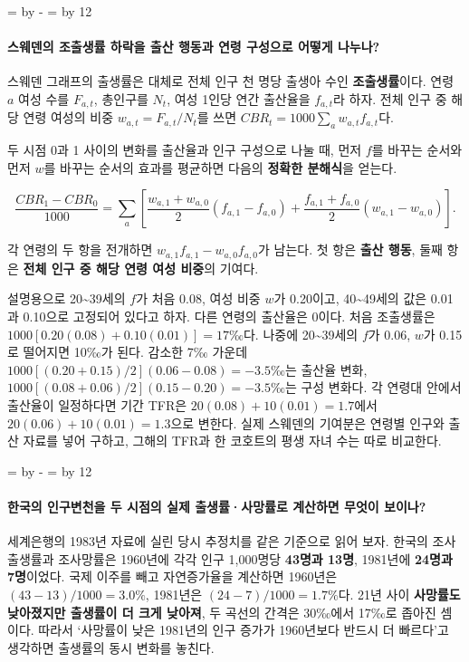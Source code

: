 \documentclass[10pt,a4paper]{article}
\newcommand{\ReserveQuestionSpace}{%
  \par\begingroup
  \dimen0=\pagegoal \advance\dimen0 by -\pagetotal
  \dimen2=\baselineskip \multiply\dimen2 by 12
  \ifdim\dimen0<\dimen2 \newpage\fi
  \endgroup}
\begin{document}
\ReserveQuestionSpace
\paragraph{스웨덴의 조출생률 하락을 출산 행동과 연령 구성으로 어떻게 나누나?}
스웨덴 그래프의 출생률은 대체로 전체 인구 천 명당 출생아 수인 \textbf{조출생률}이다. 연령 $a$ 여성 수를 $F_{a,t}$, 총인구를 $N_t$, 여성 1인당 연간 출산율을 $f_{a,t}$라 하자. 전체 인구 중 해당 연령 여성의 비중 $w_{a,t}=F_{a,t}/N_t$를 쓰면 $CBR_t=1000\sum_a w_{a,t}f_{a,t}$다.\par

두 시점 0과 1 사이의 변화를 출산율과 인구 구성으로 나눌 때, 먼저 $f$를 바꾸는 순서와 먼저 $w$를 바꾸는 순서의 효과를 평균하면 다음의 \textbf{정확한 분해식}을 얻는다.\par

\[
\frac{CBR_1-CBR_0}{1000}
=\sum_a\left[\frac{w_{a,1}+w_{a,0}}{2}(f_{a,1}-f_{a,0})
+\frac{f_{a,1}+f_{a,0}}{2}(w_{a,1}-w_{a,0})\right].
\]

각 연령의 두 항을 전개하면 $w_{a,1}f_{a,1}-w_{a,0}f_{a,0}$가 남는다. 첫 항은 \textbf{출산 행동}, 둘째 항은 \textbf{전체 인구 중 해당 연령 여성 비중}의 기여다.\par

설명용으로 20\textasciitilde{}39세의 $f$가 처음 0.08, 여성 비중 $w$가 0.20이고, 40\textasciitilde{}49세의 값은 0.01과 0.10으로 고정되어 있다고 하자. 다른 연령의 출산율은 0이다. 처음 조출생률은 $1000[0.20(0.08)+0.10(0.01)]=17$‰다. 나중에 20\textasciitilde{}39세의 $f$가 0.06, $w$가 0.15로 떨어지면 10‰가 된다. 감소한 7‰ 가운데 $1000[(0.20+0.15)/2](0.06-0.08)=-3.5$‰는 출산율 변화, $1000[(0.08+0.06)/2](0.15-0.20)=-3.5$‰는 구성 변화다. 각 연령대 안에서 출산율이 일정하다면 기간 TFR은 $20(0.08)+10(0.01)=1.7$에서 $20(0.06)+10(0.01)=1.3$으로 변한다. 실제 스웨덴의 기여분은 연령별 인구와 출산 자료를 넣어 구하고, 그해의 TFR과 한 코호트의 평생 자녀 수는 따로 비교한다.\par

\ReserveQuestionSpace
\paragraph{한국의 인구변천을 두 시점의 실제 출생률·사망률로 계산하면 무엇이 보이나?}
세계은행의 1983년 자료에 실린 당시 추정치를 같은 기준으로 읽어 보자. 한국의 조사출생률과 조사망률은 1960년에 각각 인구 1,000명당 \textbf{43명과 13명}, 1981년에 \textbf{24명과 7명}이었다. 국제 이주를 빼고 자연증가율을 계산하면 1960년은 $(43-13)/1000=3.0\%$, 1981년은 $(24-7)/1000=1.7\%$다. 21년 사이 \textbf{사망률도 낮아졌지만 출생률이 더 크게 낮아져}, 두 곡선의 간격은 30‰에서 17‰로 좁아진 셈이다. 따라서 ‘사망률이 낮은 1981년의 인구 증가가 1960년보다 반드시 더 빠르다’고 생각하면 출생률의 동시 변화를 놓친다.\par
\end{document}
